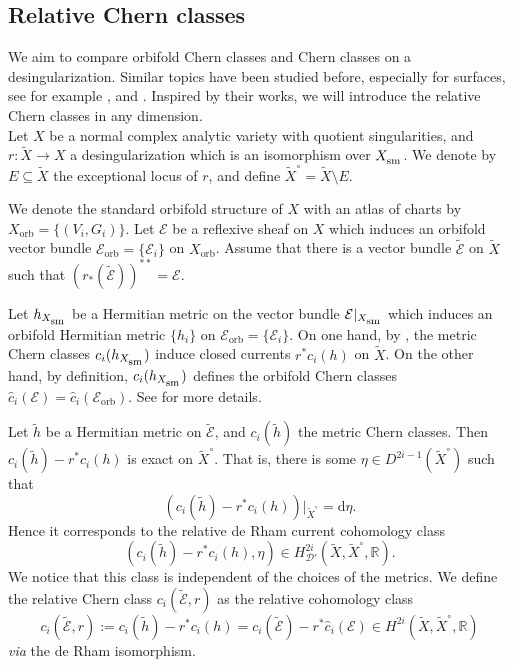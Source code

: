 \documentclass[12pt]{amsart}
\newcommand{\<}{\leq}
\def\mcE{\mathcal{E}}
\theoremstyle{remark}
\theoremstyle{definition}
\theoremstyle{definition}
\numberwithin{equation}{section}
\theoremstyle{definition}
\theoremstyle{definition}
\def\sm{\operatorname{\textsubscript{\rm sm}}}
\def\orb{\mathrm{orb}}
\begin{document}
\subsection{Relative Chern classes}\label{subsec:relative-class}

We aim to compare orbifold Chern classes and Chern classes on a desingularization. 
Similar topics have been studied before, especially for surfaces, see for example  \cite{Wahl1993}, \cite{Bla96} and \cite{Langer2000}.  
Inspired by their works, we will introduce the relative Chern classes in any dimension. \\


Let $X$ be a normal complex analytic variety with quotient singularities,  and $r\colon \widetilde{X} \to X$ a desingularization which is an isomorphism over  $X_{\sm}$. 
We denote by $E\subseteq \widetilde{X}$ the exceptional locus of $r$, and define $\widetilde{X}^\circ = \widetilde{X}\setminus E$.


We denote the standard orbifold structure of $X$  with an atlas of charts by $X_{\orb} = \{(V_i, G_i) \}$. 
Let $\mcE$ be a reflexive sheaf on $X$ which induces an orbifold vector bundle $\mcE_{\orb}= \{\mcE_i\}$ on $X_{\orb}$. 
Assume that there is a vector bundle $\widetilde{\mcE}$ on $\widetilde{X}$ such that $(r_*(\widetilde{\mcE}))^{**} = \mcE$. 

Let $h_{X_{\sm}}$ be a Hermitian metric on the vector bundle $\mcE|_{X_{\sm }}$ which induces an orbifold Hermitian metric $\{h_i\}$ on $\mcE_{\orb}=\{\mcE_i\}$. On one hand, by \cite[Lemma 1.15]{Bla96}, the metric Chern classes $c_i(h_{X_{\sm }})$ induce closed currents $r^*c_i(h)$ on $\widetilde{X}$. 
On the other hand, by definition, $c_i(h_{X_{\sm}})$ defines the orbifold Chern classes $\hat{c}_i(\mcE) = \hat{c}_i(\mcE_{\orb})$. 
See  \cite[Section 2]{Bla96} for more details.

Let $\tilde{h}$ be a Hermitian metric on $\widetilde{\mcE}$, and $c_i(\tilde{h})$ the metric Chern classes.  
Then $c_i(\tilde{h})-r^*c_i(h)$ is exact on  $\widetilde{X}^\circ$. 
That is, there is some $\eta \in D^{2i-1}(\widetilde{X}^\circ)$ such that 
\[(c_i(\tilde{h})-r^*c_i(h) )|_{\widetilde{X}^\circ}  = \mathrm{d}\eta.
\]
Hence it corresponds to the relative de Rham current cohomology class
\[ ( c_i(\tilde{h})-r^*c_i(h) , \eta) \in H^{2i}_{\mathscr{D}'}(\widetilde{X},   \widetilde{X}^\circ, \mathbb{R}).
\]  
We notice that this class is independent of the choices of the metrics. 
We define the relative Chern class $c_i(\widetilde{\mcE}, r)$ as  the relative cohomology class 
\begin{equation}\label{eqn:relative-class-E}
 c_i(\widetilde{\mcE}, r):=   c_i(\tilde{h})-r^*c_i(h) = c_i(\widetilde{\mcE}) - r^*\hat{c}_i(\mcE) \in H^{2i}(\widetilde{X},  \widetilde{X}^\circ, \mathbb{R})
\end{equation}
\textit{via} the de Rham isomorphism. 
\end{document}

